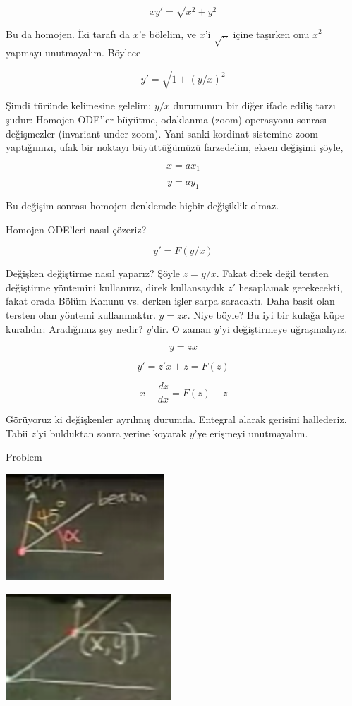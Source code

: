 \documentclass[12pt,fleqn]{article}\usepackage{../../common}
\begin{document}
$$ xy' = \sqrt{x^2 + y^2} $$

Bu da homojen. İki tarafı da $x$'e bölelim, ve $x$'i $\sqrt{..}$ içine
taşırken onu $x^2$ yapmayı unutmayalım. Böylece

$$ y' = \sqrt{1+(y/x)^2} $$

Şimdi türünde kelimesine gelelim: $y/x$ durumunun bir diğer ifade ediliş
tarzı şudur: Homojen ODE'ler büyütme, odaklanma (zoom) operasyonu sonrası
değişmezler (invariant under zoom). Yani sanki kordinat sistemine zoom
yaptığımızı, ufak bir noktayı büyüttüğümüzü farzedelim, eksen değişimi
şöyle,

$$ x = ax_1 $$

$$ y = ay_1 $$

Bu değişim sonrası homojen denklemde hiçbir değişiklik olmaz.

Homojen ODE'leri nasıl çözeriz?

$$ y' = F(y/x) $$

Değişken değiştirme nasıl yaparız? Şöyle $z = y/x$. Fakat direk değil
tersten değiştirme yöntemini kullanırız, direk kullansaydık $z'$ hesaplamak
gerekecekti, fakat orada Bölüm Kanunu vs. derken işler sarpa
saracaktı. Daha basit olan tersten olan yöntemi kullanmaktır.  $y =
zx$. Niye böyle? Bu iyi bir kulağa küpe kuralıdır: Aradığımız şey nedir?
$y$'dir. O zaman $y$'yi değiştirmeye uğraşmalıyız.

$$ y = zx $$

$$ y' = z'x + z = F(z)$$

$$ x - \frac{dz}{dx} = F(z) - z $$

Görüyoruz ki değişkenler ayrılmış durumda. Entegral alarak gerisini
hallederiz. Tabii $z$'yi bulduktan sonra yerine koyarak $y$'ye erişmeyi
unutmayalım.

Problem

\includegraphics[height=4cm]{4_1.png}

\includegraphics[height=4cm]{4_2.png}
\end{document}
